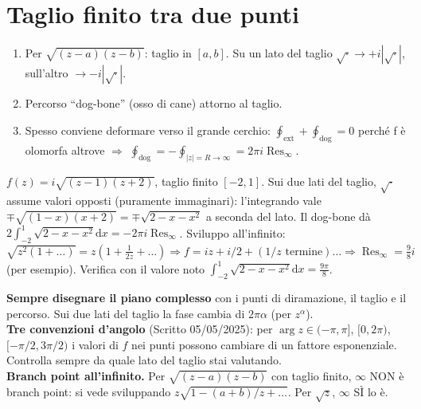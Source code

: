 \documentclass[11pt,a4paper,openany]{book}
\theoremstyle{definition}
\newcommand{\dd}{\mathrm{d}}
\DeclareMathOperator{\Res}{Res}
\begin{document}
\section{Taglio finito tra due punti}

\begin{algoritmo}
\begin{enumerate}
\item Per $\sqrt{(z-a)(z-b)}$: taglio in $[a,b]$. Su un lato del taglio $\sqrt{\cdot}\to +i|\sqrt{\cdot}|$, sull'altro $\to -i|\sqrt{\cdot}|$.
\item Percorso ``dog-bone'' (osso di cane) attorno al taglio.
\item Spesso conviene deformare verso il grande cerchio: $\oint_{\text{ext}}+\oint_{\text{dog}}=0$ perch\'e f \`e olomorfa altrove $\Rightarrow$ $\oint_{\text{dog}}=-\oint_{|z|=R\to\infty}=2\pi i\Res_\infty$.
\end{enumerate}
\end{algoritmo}

\begin{esempio}[Scritto 16/11/2023, Es. 2]
$f(z)=i\sqrt{(z-1)(z+2)}$, taglio finito $[-2,1]$. Sui due lati del taglio, $\sqrt{\cdot}$ assume valori opposti (puramente immaginari): l'integrando vale $\mp\sqrt{(1-x)(x+2)}=\mp\sqrt{2-x-x^2}$ a seconda del lato. Il dog-bone d\`a $2\int_{-2}^1\sqrt{2-x-x^2}\dd x=-2\pi i\Res_\infty$. Sviluppo all'infinito: $\sqrt{z^2(1+\dots)}=z(1+\tfrac{1}{2z}+\dots)\Rightarrow f=iz+i/2+(\text{$1/z$ termine})\dots\Rightarrow\Res_\infty=\tfrac{9}{8}i$ (per esempio). Verifica con il valore noto $\int_{-2}^1\sqrt{2-x-x^2}\dd x=\tfrac{9\pi}{8}$.
\end{esempio}

\begin{trucco}
\textbf{Sempre disegnare il piano complesso} con i punti di diramazione, il taglio e il percorso. Sui due lati del taglio la fase cambia di $2\pi\alpha$ (per $z^\alpha$).\\
\textbf{Tre convenzioni d'angolo} (Scritto 05/05/2025): per $\arg z\in(-\pi,\pi]$, $[0,2\pi)$, $[-\pi/2,3\pi/2)$ i valori di $f$ nei punti possono cambiare di un fattore esponenziale. Controlla sempre da quale lato del taglio stai valutando.\\
\textbf{Branch point all'infinito.} Per $\sqrt{(z-a)(z-b)}$ con taglio finito, $\infty$ NON \`e branch point: si vede sviluppando $z\sqrt{1-(a+b)/z+\dots}$. Per $\sqrt z$, $\infty$ S\`I lo \`e.
\end{trucco}
\end{document}
